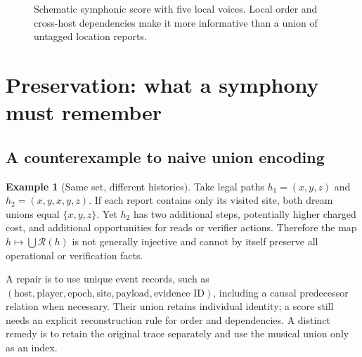 \documentclass[11pt,letterpaper]{article}
\theoremstyle{definition}
\newtheorem{example}[theorem]{Example}
\theoremstyle{remark}
\begin{document}
\begin{figure}[htbp]
\centering
{}
\caption{Schematic symphonic score with five local voices. Local order and cross-host dependencies make it more informative than a union of untagged location reports.}
\label{fig:score}
\end{figure}

\section{Preservation: what a symphony must remember}
\subsection{A counterexample to naive union encoding}
\begin{example}[Same set, different histories]\label{ex:loss}
Take legal paths $h_1=(x,y,z)$ and $h_2=(x,y,x,y,z)$. If each report contains only its visited site, both dream unions equal $\{x,y,z\}$. Yet $h_2$ has two additional steps, potentially higher charged cost, and additional opportunities for reads or verifier actions. Therefore the map $h\mapsto\bigcup\mathcal R(h)$ is not generally injective and cannot by itself preserve all operational or verification facts.
\end{example}

A repair is to use unique event records, such as $(\text{host},\text{player},\text{epoch},\text{site},\text{payload},\text{evidence ID})$, including a causal predecessor relation when necessary. Their union retains individual identity; a score still needs an explicit reconstruction rule for order and dependencies. A distinct remedy is to retain the original trace separately and use the musical union only as an index.
\end{document}
